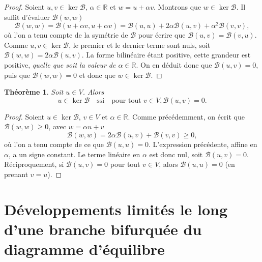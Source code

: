 \documentclass[12pt, final]{amsart}
\newtheorem{theorem}{Théorème}
\begin{document}
\begin{proof}
  Soient $u, v \in \ker \mathcal{B}$, $\alpha \in \mathbb{R}$ et $w = u +
  \alpha v$. Montrons que $w \in \ker \mathcal{B}$. Il suffit d'évaluer
  $\mathcal{B} (w, w)$
  \begin{equation}
    \mathcal{B} (w, w) =\mathcal{B} (u + \alpha v, u + \alpha v) =\mathcal{B}
    (u, u) + 2 \alpha \mathcal{B} (u, v) + \alpha^2 \mathcal{B} (v, v),
  \end{equation}
  où l'on a tenu compte de la symétrie de $\mathcal{B}$ pour
  écrire que $\mathcal{B} (u, v) =\mathcal{B} (v, u)$. Comme $u, v \in
  \ker \mathcal{B}$, le premier et le dernier terme sont nuls, soit
  $\mathcal{B} (w, w) = 2 \alpha \mathcal{B} (u, v)$. La forme bilinéaire
  étant positive, cette grandeur est positive, \emph{quelle que soit la
  valeur de $\alpha \in \mathbb{R}$}. On en déduit donc que $\mathcal{B}
  (u, v) = 0$, puis que $\mathcal{B} (w, w) = 0$ et donc que $w \in \ker
  \mathcal{B}.$
\end{proof}

\begin{theorem}
  Soit $u \in V$. Alors
  \begin{equation}
    u \in \ker \mathcal{B} \quad \text{ssi} \quad \text{pour tout } v \in V,
    \mathcal{B} (u, v) = 0.
  \end{equation}
\end{theorem}

\begin{proof}
  Soient $u \in \ker \mathcal{B}$, $v \in V$ et $\alpha \in \mathbb{R}$. Comme
  précédemment, on écrit que $\mathcal{B} (w, w) \geq 0$, avec $w
  = \alpha u + v$
  \begin{equation}
    \mathcal{B} (w, w) = 2 \alpha \mathcal{B} (u, v) +\mathcal{B} (v, v) \geq
    0,
  \end{equation}
  où l'on a tenu compte de ce que $\mathcal{B} (u, u) = 0$. L'expression
  précédente, affine en $\alpha$, a un signe constant. Le terme
  linéaire en $\alpha$ est donc nul, soit $\mathcal{B} (u, v) = 0$.
  Réciproquement, si $\mathcal{B} (u, v) = 0$ pour tout $v \in V$, alors
  $\mathcal{B} (u, u) = 0$ (en prenant $v = u$).
\end{proof}

\section{Développements limités le long d'une branche bifurquée du
diagramme d'équilibre}
\end{document}
